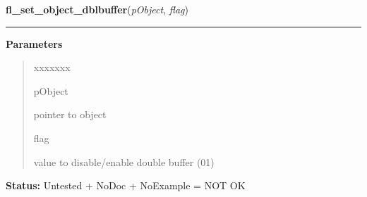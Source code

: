 \hspace{.8\funcindent}\begin{boxedminipage}{\funcwidth}

    \raggedright \textbf{fl\_set\_object\_dblbuffer}(\textit{pObject}, \textit{flag})

    \vspace{-1.5ex}

    \rule{\textwidth}{0.5\fboxrule}
\setlength{\parskip}{2ex}
\setlength{\parskip}{1ex}
      \textbf{Parameters}
      \vspace{-1ex}

      \begin{quote}
        \begin{Ventry}{xxxxxxx}

          \item[pObject]

          pointer to object

          \item[flag]

          value to disable/enable double buffer (0{\textbar}1)

        \end{Ventry}

      \end{quote}

\textbf{Status:} Untested + NoDoc + NoExample = NOT OK



    \end{boxedminipage}

    \label{xformslib:library:fl_set_object_color}

    \vspace{0.5ex}

